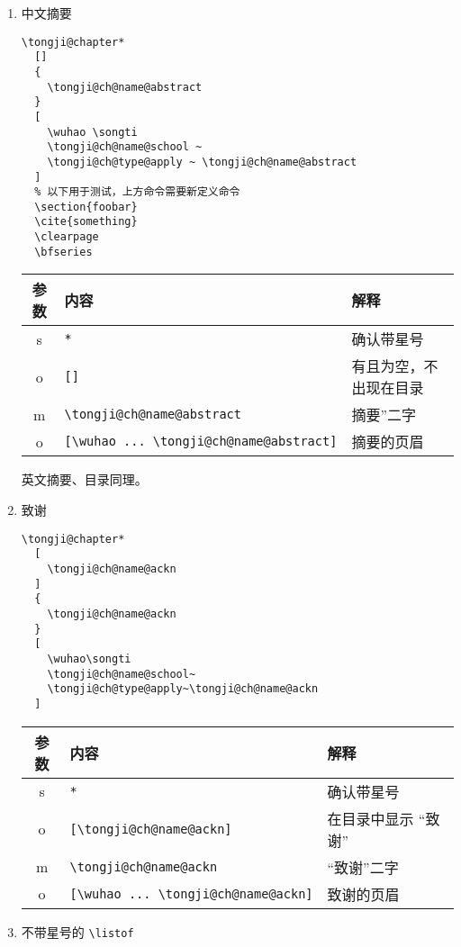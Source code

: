 \documentclass[../Main/thesis.tex]{subfiles}
\begin{document}
\begin{enumerate}

  \item 中文摘要

\begin{lstlisting}[language={TongjiLaTeX},style=colorEX]
\tongji@chapter*
  []
  {
    \tongji@ch@name@abstract
  }
  [
    \wuhao \songti
    \tongji@ch@name@school ~
    \tongji@ch@type@apply ~ \tongji@ch@name@abstract
  ]
  % 以下用于测试，上方命令需要新定义命令
  \section{foobar}
  \cite{something}
  \clearpage
  \bfseries
\end{lstlisting}

  \begin{longtable}[]{@{}cll@{}}
  \toprule
  参数 & 内容 & 解释\tabularnewline
  \midrule
  \endhead
  s & \texttt{*} & 确认带星号 \tabularnewline
  o & \texttt{[]} & 有且为空，不出现在目录 \tabularnewline
  m & \texttt{\textbackslash{}tongji@ch@name@abstract} &
  摘要''二字 \tabularnewline
  o &
  \texttt{[\textbackslash{}wuhao\ ...\ \textbackslash{}tongji@ch@name@abstract]}
  & 摘要的页眉\tabularnewline
  \bottomrule
  \end{longtable}

  英文摘要、目录同理。

  \item 致谢

\begin{lstlisting}[language={TongjiLaTeX}, style=colorEX]
\tongji@chapter*
  [
    \tongji@ch@name@ackn
  ]
  {
    \tongji@ch@name@ackn
  }
  [
    \wuhao\songti
    \tongji@ch@name@school~
    \tongji@ch@type@apply~\tongji@ch@name@ackn
  ]
\end{lstlisting}

  \begin{longtable}[]{@{}cll@{}}
  \toprule
  参数 & 内容 & 解释\tabularnewline
  \midrule
  \endhead
  s & \texttt{*} & 确认带星号\tabularnewline
  o & \texttt{[\textbackslash{}tongji@ch@name@ackn]} &
  在目录中显示 “致谢” \tabularnewline
  m & \texttt{\textbackslash{}tongji@ch@name@ackn} &
  “致谢”二字\tabularnewline
  o &
  \texttt{[\textbackslash{}wuhao\ ...\ \textbackslash{}tongji@ch@name@ackn]}
  & 致谢的页眉\tabularnewline
  \bottomrule
  \end{longtable}

\item 不带星号的 \texttt{\textbackslash{}listof}


\end{enumerate}
\end{document}
